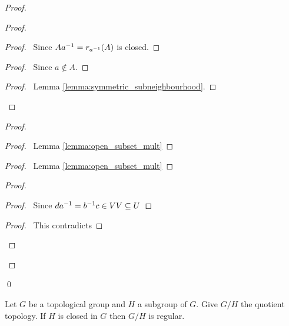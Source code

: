 \begin{proof}
    \pf
    \begin{proof}
        \begin{proof}
            \pf\ Since $A {a}^{-1} = r_{{a}^{-1}}(A)$ is closed.
        \end{proof}
        \begin{proof}
            \pf\ Since $a \notin A$.
        \end{proof}
        \qedstep
        \begin{proof}
            \pf\ Lemma \ref{lemma:symmetric_subneighbourhood}.
        \end{proof}
    \end{proof}
    \begin{proof}
        \begin{proof}
            \pf\ Lemma \ref{lemma:open_subset_mult}
        \end{proof}
        \begin{proof}
            \pf\ Lemma \ref{lemma:open_subset_mult}
        \end{proof}
        \begin{proof}
            \begin{proof}
                \pf\ Since $d {a}^{-1} = {b}^{-1} c \in VV \subseteq U$
            \end{proof}
            \qedstep
            \begin{proof}
                \pf\ This contradicts 
            \end{proof}
        \end{proof}
    \end{proof}
    \qed
\end{proof}

\begin{proposition}
    \label{proposition:regular_quotient}
    Let $G$ be a topological group and $H$ a subgroup of $G$. Give $G / H$
    the quotient topology. If $H$ is closed in $G$ then $G / H$ is regular.
\end{proposition}

